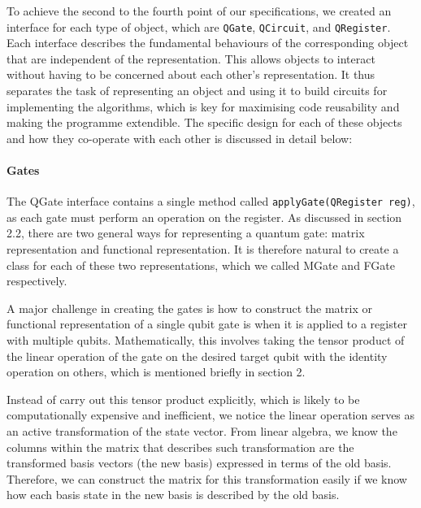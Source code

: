 \documentclass[bibliography=totocnumbered]{article}
\theoremstyle{NoticeStyle}
\begin{document}
To achieve the second to the fourth point of our specifications, we created an interface for each type of object, which are \texttt{QGate}, \texttt{QCircuit}, and \texttt{QRegister}. Each interface describes the fundamental behaviours of the corresponding object that are independent of the representation. This allows objects to interact without having to be concerned about each other’s representation. It thus separates the task of representing an object and using it to build circuits for implementing the algorithms, which is key for maximising code reusability and making the programme extendible. The specific design for each of these objects and how they co-operate with each other is discussed in detail below: 

\paragraph{Gates}
The QGate interface contains a single method called \texttt{applyGate(QRegister reg)}, as each gate must perform an operation on the register. As discussed in section 2.2, there are two general ways for representing a quantum gate: matrix representation and functional representation. It is therefore natural to create a class for each of these two representations, which we called MGate and FGate respectively.

A major challenge in creating the gates is how to construct the matrix or functional representation of a single qubit gate is when it is applied to a register with multiple qubits. Mathematically, this involves taking the tensor product of the linear operation of the gate on the desired target qubit with the identity operation on others, which is mentioned briefly in section 2. 

Instead of carry out this tensor product explicitly, which is likely to be computationally expensive and inefficient, we notice the linear operation serves as an active transformation of the state vector. From linear algebra, we know the columns within the matrix that describes such transformation are the transformed basis vectors (the new basis) expressed in terms of the old basis. Therefore, we can construct the matrix for this transformation easily if we know how each basis state in the new basis is described by the old basis. 
\end{document}
